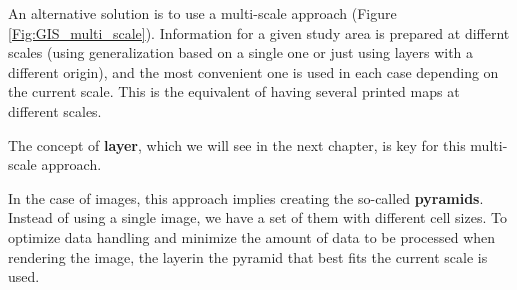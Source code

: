 An alternative solution is to use a multi-scale approach (Figure \ref{Fig:GIS_multi_scale}). Information for a given study area is prepared at differnt scales (using generalization based on a single one or just using layers with a different origin), and the most convenient one is used in each case depending on the current scale. This is the equivalent of having several printed maps at different scales.

The concept of \textbf{layer}, which we will see in the next chapter, is key for this multi-scale approach.

In the case of images, this approach implies creating the so-called \textbf{pyramids}. Instead of using a single image, we have a set of them with different cell sizes. To optimize data handling and minimize the amount of data to be processed when rendering the image, the layerin the pyramid that best fits the current scale is used.

\pagestyle{empty}

